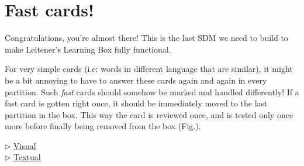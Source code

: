 \newpage
\section{Fast cards!}
\genHeader
\hypertarget{sec:fastCard}{}

Congratulations, you're almost there! This is the last SDM we need to build to make Leitener's Learning Box fully functional.

For very simple cards (i.e: words in different language that are similar), it might be a bit annoying to have to answer these cards again and again in every
partition. Such \emph{fast} cards should somehow be marked and handled differently! If a fast card is gotten right once, it should be immediately moved to the
last partition in the box. This way the card is reviewed once, and is tested only once more before finally being removed from the box (Fig.).


\begin{center} {$\triangleright$ \hyperlink{fastCard vis}{Visual}}%
\\ \vspace{0.5cm} {$\triangleright$ \hyperlink{fastCard tex}{Textual} }\end{center} 




